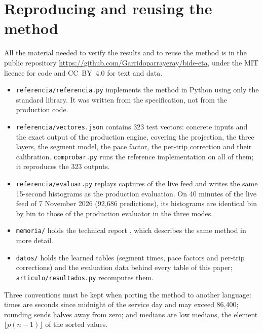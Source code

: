 \documentclass[preprint,11pt,nonatbib]{elsarticle}
\begin{document}


\section{Reproducing and reusing the method}
\label{sec:reuse}

All the material needed to verify the results and to reuse the method is in the public repository
\url{https://github.com/Garridoparrayeray/bide-eta}, under the MIT licence for code and CC~BY~4.0 for text and data.

\begin{itemize}
  \item \texttt{referencia/referencia.py} implements the method in Python using only the standard library. It was
        written from the specification, not from the production code.
  \item \texttt{referencia/vectores.json} contains 323 test vectors: concrete inputs and the exact output of the
        production engine, covering the projection, the three layers, the segment model, the pace factor, the
        per-trip correction and their calibration. \texttt{comprobar.py} runs the reference implementation on all of
        them; it reproduces the 323 outputs.
  \item \texttt{referencia/evaluar.py} replays captures of the live feed and writes the same 15-second histograms as
        the production evaluation. On 40 minutes of the live feed of 7 November 2026 (92,686 predictions), its
        histograms are identical bin by bin to those of the production evaluator in the three modes.
  \item \texttt{memoria/} holds the technical report \parencite{garrido2026memoria}, which describes the same method
        in more detail.
  \item \texttt{datos/} holds the learned tables (segment times, pace factors and per-trip corrections) and the
        evaluation data behind every table of this paper; \texttt{articulo/resultados.py} recomputes them.
\end{itemize}

\noindent Three conventions must be kept when porting the method to another language: times are seconds since
midnight of the service day and may exceed 86,400; rounding sends halves away from zero; and medians are low medians,
the element $\lfloor p(n-1)\rfloor$ of the sorted values.
\end{document}
